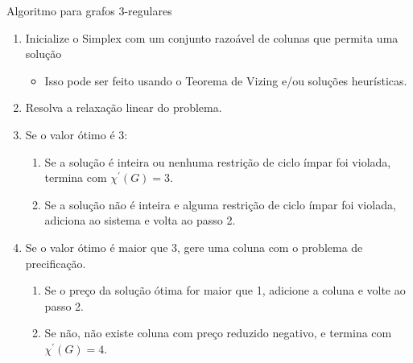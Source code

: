 \documentclass{beamer}
\begin{document}
    \begin{frame}{Algoritmo para grafos 3-regulares}

        \begin{enumerate}
            \item Inicialize o Simplex com um conjunto razoável de colunas que permita uma solução
            \begin{itemize}
                \item Isso pode ser feito usando o Teorema de Vizing e/ou soluções heurísticas.
            \end{itemize}
            \item Resolva a relaxação linear do problema.
            \item Se o valor ótimo é 3:
            \begin{enumerate}
                \item Se a solução é inteira ou nenhuma restrição de ciclo ímpar foi violada, termina com {\color{blue} $\chi^\prime(G) = 3$}.
                \item Se a solução não é inteira e alguma restrição de ciclo ímpar foi violada, adiciona ao sistema e volta ao passo {\color{blue} 2}.
            \end{enumerate}
            \item Se o valor ótimo é maior que 3, gere uma coluna com o problema de precificação.
            \begin{enumerate}
                \item Se o preço da solução ótima for maior que 1, adicione a coluna e volte ao passo {\color{blue} 2}.
                \item Se não, não existe coluna com preço reduzido negativo, e termina com {\color{blue} $\chi^\prime(G) = 4$}.
            \end{enumerate}
        \end{enumerate}
    \end{frame}
\end{document}
